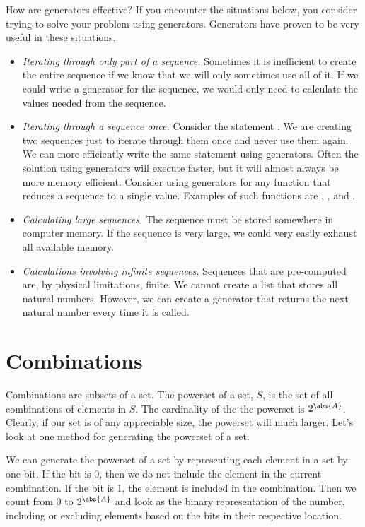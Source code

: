 How are generators effective?  If you encounter the situations below, you consider trying to solve 
your problem using generators.  Generators have proven to be very useful in these situations.
\begin{itemize}
\item \emph{Iterating through only part of a sequence.}  Sometimes it is inefficient to create the 
entire sequence if we know that we will only sometimes use all of it.  If we could write a generator for 
the sequence, we would only need to calculate the values needed from the sequence.
\item \emph{Iterating through a sequence once.} Consider the statement 
.
We are creating two sequences just to iterate through them once and never use them again.
We can more efficiently write the same statement using generators.
Often the solution using generators will execute faster, but it will almost always be more memory efficient.  Consider using generators for any function that reduces a sequence to a single value.  Examples of such functions are , , and .
\item \emph{Calculating large sequences.}  The sequence must be stored somewhere in computer memory.
If the sequence is very large, we could very easily exhaust all available memory.
\item \emph{Calculations involving infinite sequences.}  Sequences that are pre-computed are, by physical limitations, finite.  We cannot create a list that stores all natural numbers.  However, we can create a generator that returns the next natural number every time it is called.
\end{itemize}


\section*{Combinations}
Combinations are subsets of a set.  The powerset of a set, $S$, is the set of all combinations
of elements in $S$.  The cardinality of the the powerset is $2^{\abs{A}}$.  Clearly, if our
set is of any appreciable size, the powerset will much larger.  Let's look at one method for
generating the powerset of a set.

We can generate the powerset of a set by representing each element in a set by one bit.
If the bit is 0, then we do not include the element in the current combination.  If the
bit is 1, the element is included in the combination.  Then we count from 0 to $2^{\abs{A}}$
and look as the binary representation of the number, including or excluding elements based
on the bits in their respective location.

